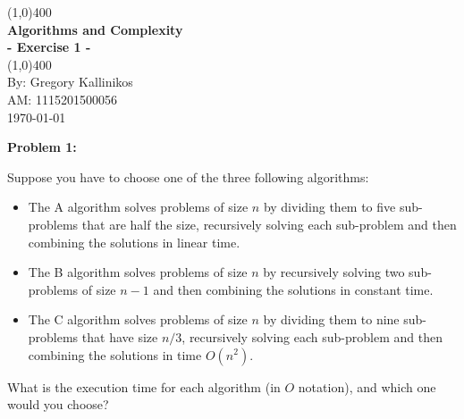 \documentclass[12pt]{article}
\begin{document}
\begin{titlepage}
\begin{center}
\line(1,0){400}\\
\Large{\textbf{Algorithms and Complexity}}\\
\Large{\textbf{- Exercise 1 -}}\\
\line(1,0){400}\\
\vfill
By: Gregory Kallinikos\\
AM: 1115201500056\\
\today\\
\end{center}
\end{titlepage}

\begin{center}
\textbf{Problem 1:}
\end{center}
Suppose you have to choose one of the three following algorithms:

\begin{itemize}
\item The A algorithm solves problems of size $n$ by dividing them to five sub-problems that are half the size, recursively solving each sub-problem and then combining the solutions in linear time.

\item The B algorithm solves problems of size $n$ by recursively solving two sub-problems of size $n-1$ and then combining the solutions in constant time.

\item The C algorithm solves problems of size $n$ by dividing them to nine sub-problems that have size $n/3$, recursively solving each sub-problem and then combining the solutions in time $O(n^2)$.
\end{itemize}

What is the execution time for each algorithm (in $O$ notation), and which one would you choose?
\end{document}
